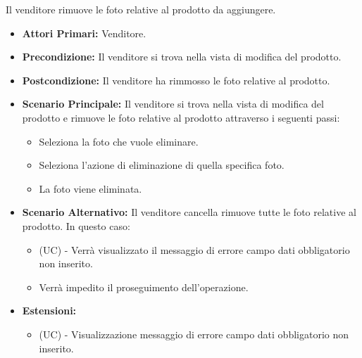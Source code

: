 Il venditore rimuove le foto relative al prodotto da aggiungere.
\begin{itemize}
    \item \textbf{Attori Primari:} Venditore.
    \item \textbf{Precondizione:} Il venditore si trova nella vista di modifica del prodotto.
    \item \textbf{Postcondizione:} Il venditore ha rimmosso le foto relative al prodotto.
    \item \textbf{Scenario Principale:} Il venditore si trova nella vista di modifica del prodotto e rimuove le foto relative al prodotto attraverso i seguenti passi:
    \begin{itemize}
        \item Seleziona la foto che vuole eliminare.
        \item Seleziona l'azione di eliminazione di quella specifica foto.
        \item La foto viene eliminata.
    \end{itemize}
    \item \textbf{Scenario Alternativo:} Il venditore cancella rimuove tutte le foto relative al prodotto. In questo caso:
    \begin{itemize}
        \item (UC) - Verrà visualizzato il messaggio di errore campo dati obbligatorio non inserito.
        \item Verrà impedito il proseguimento dell'operazione.
    \end{itemize}
    \item \textbf{Estensioni:}
    \begin{itemize}
        \item (UC) - Visualizzazione messaggio di errore campo dati obbligatorio non inserito.
    \end{itemize}
\end{itemize}


